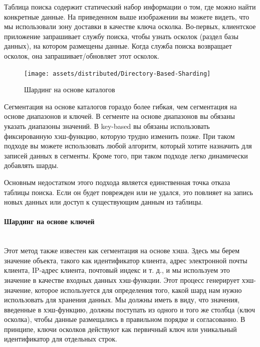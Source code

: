 Таблица поиска содержит статический набор информации о том, где можно найти конкретные данные. На приведенном выше
изображении вы можете видеть, что мы использовали зону доставки в качестве ключа осколка. Во-первых, клиентское
приложение запрашивает службу поиска, чтобы узнать осколок (раздел базы данных), на котором размещены данные. Когда
служба поиска возвращает осколок, она запрашивает/обновляет этот осколок.

\begin{figure}[H]
    \centering
    \texttt{[image: assets/distributed/Directory-Based-Sharding]}
    \caption{Шардинг на основе каталогов}
    \label{fig:Directory-Based-Sharding}
\end{figure}

Сегментация на основе каталогов гораздо более гибкая, чем сегментация на основе диапазонов и ключей. В сегменте на
основе диапазонов вы обязаны указать диапазоны значений. В key-based вы обязаны использовать фиксированную хэш-функцию,
которую трудно изменить позже. При таком подходе вы можете использовать любой алгоритм, который хотите назначить для
записей данных в сегменты. Кроме того, при таком подходе легко динамически добавлять шарды.

Основным недостатком этого подхода является единственная точка отказа таблицы поиска. Если он будет поврежден или не
удался, это повлияет на запись новых данных или доступ к существующим данным из таблицы. \autocite{DatabaseSharding}

\paragraph{Шардинг на основе ключей} ~\\
Этот метод также известен как сегментация на основе хэша. Здесь мы берем значение объекта, такого как идентификатор
клиента, адрес электронной почты клиента, IP-адрес клиента, почтовый индекс и т. д., и мы используем это значение в
качестве входных данных хэш-функции. Этот процесс генерирует хэш-значение, которое используется для определения того,
какой шард нам нужно использовать для хранения данных. Мы должны иметь в виду, что значения, введенные в хэш-функцию,
должны поступать из одного и того же столбца (ключ осколка), чтобы данные размещались в правильном порядке и
согласованно. В принципе, ключи осколков действуют как первичный ключ или уникальный идентификатор для отдельных строк.

